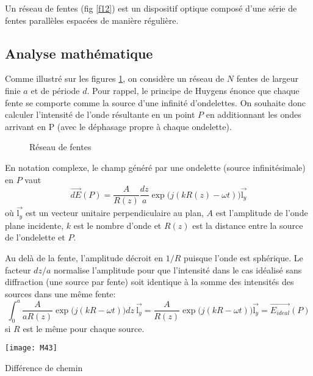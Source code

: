 Un réseau de fentes (fig \ref{f12}) est un dispositif optique composé d'une série de fentes parallèles espacées de manière régulière.

\subsection{Analyse mathématique}

Comme illustré sur les figures \ref{d10}, on considère un réseau de $N$ fentes de largeur finie $a$ et de période $d$. Pour rappel, le principe de Huygens énonce que chaque fente se comporte comme la source d'une infinité d'ondelettes. On souhaite donc calculer l'intensité de l'onde résultante en un point $P$ en additionnant les ondes arrivant en P (avec le déphasage propre à chaque ondelette).

\begin{figure}[h]
\centering
\subfloat[]{\texttt{[image: M41]}}
        \quad
\subfloat[]{\texttt{[image: M42]}}
\caption{Réseau de fentes}
        \label{d10}
\end{figure}

\noindent En notation complexe, le champ généré par une ondelette (source infinitésimale) en $P$ vaut
$$
 \overset\rightarrow{dE}(P)=\frac{A}{R(z)}\frac{dz}{a}\exp\big(j(kR(z)-\omega t)\big)\overset\rightarrow{\mbox{l}_y}
$$
où $\overset\rightarrow{\mbox{l}_y}$ est un vecteur unitaire perpendiculaire au plan, $A$ est l'amplitude de l'onde plane incidente, $k$ est le nombre d'onde et $R(z)$ est la distance entre la source de l'ondelette et $P$.

Au delà de la fente, l'amplitude décroit en $1/R$ puisque l'onde est sphérique. Le facteur $dz/a$ normalise l'amplitude pour que l'intensité dans le cas idéalisé sans diffraction (une source par fente) soit identique à la somme des intensités des sources dans une même fente:
$$
 \int_0^a\frac{A}{aR(z)}\exp\big(j(kR-\omega t)\big)dz\:\overset\rightarrow{\mbox{l}_y}=\frac{A}{R(z)}\exp\big(j(kR-\omega t)\big)\overset\rightarrow{\mbox{l}_y}=\overset\rightarrow{E_{ideal}}(P)
$$
si $R$ est le même pour chaque source.

\begin{marginfigure}[0cm]
\texttt{[image: M43]}
\caption{Différence de chemin}
\label{f14}
\end{marginfigure}

